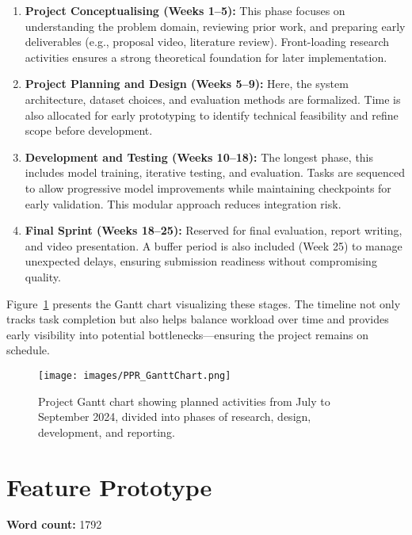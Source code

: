 \documentclass[12pt]{article}
\begin{document}
\begin{enumerate}
    \item \textbf{Project Conceptualising (Weeks 1–5):} This phase focuses on understanding the problem domain, reviewing prior work, and preparing early deliverables (e.g., proposal video, literature review). Front-loading research activities ensures a strong theoretical foundation for later implementation.

    \item \textbf{Project Planning and Design (Weeks 5–9):} Here, the system architecture, dataset choices, and evaluation methods are formalized. Time is also allocated for early prototyping to identify technical feasibility and refine scope before development.

    \item \textbf{Development and Testing (Weeks 10–18):} The longest phase, this includes model training, iterative testing, and evaluation. Tasks are sequenced to allow progressive model improvements while maintaining checkpoints for early validation. This modular approach reduces integration risk.

    \item \textbf{Final Sprint (Weeks 18–25):} Reserved for final evaluation, report writing, and video presentation. A buffer period is also included (Week 25) to manage unexpected delays, ensuring submission readiness without compromising quality.
\end{enumerate}

Figure~\ref{fig:gantt} presents the Gantt chart visualizing these stages. The timeline not only tracks task completion but also helps balance workload over time and provides early visibility into potential bottlenecks—ensuring the project remains on schedule.

\begin{figure}[H]
    \centering
    \texttt{[image: images/PPR\_GanttChart.png]}
    \caption{Project Gantt chart showing planned activities from July to September 2024, divided into phases of research, design, development, and reporting.}
    \label{fig:gantt}
\end{figure}

\newpage
\section{Feature Prototype}
\noindent\textbf{Word count:} 1792
\vspace{1em}
\end{document}
